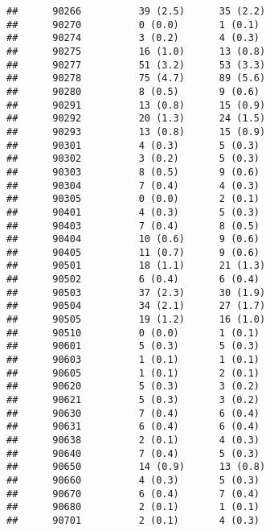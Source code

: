 \documentclass[]{article}
\begin{document}
\begin{verbatim}
##      90266          39 (2.5)      35 (2.2)                      
##      90270          0 (0.0)       1 (0.1)                       
##      90274          3 (0.2)       4 (0.3)                       
##      90275          16 (1.0)      13 (0.8)                      
##      90277          51 (3.2)      53 (3.3)                      
##      90278          75 (4.7)      89 (5.6)                      
##      90280          8 (0.5)       9 (0.6)                       
##      90291          13 (0.8)      15 (0.9)                      
##      90292          20 (1.3)      24 (1.5)                      
##      90293          13 (0.8)      15 (0.9)                      
##      90301          4 (0.3)       5 (0.3)                       
##      90302          3 (0.2)       5 (0.3)                       
##      90303          8 (0.5)       9 (0.6)                       
##      90304          7 (0.4)       4 (0.3)                       
##      90305          0 (0.0)       2 (0.1)                       
##      90401          4 (0.3)       5 (0.3)                       
##      90403          7 (0.4)       8 (0.5)                       
##      90404          10 (0.6)      9 (0.6)                       
##      90405          11 (0.7)      9 (0.6)                       
##      90501          18 (1.1)      21 (1.3)                      
##      90502          6 (0.4)       6 (0.4)                       
##      90503          37 (2.3)      30 (1.9)                      
##      90504          34 (2.1)      27 (1.7)                      
##      90505          19 (1.2)      16 (1.0)                      
##      90510          0 (0.0)       1 (0.1)                       
##      90601          5 (0.3)       5 (0.3)                       
##      90603          1 (0.1)       1 (0.1)                       
##      90605          1 (0.1)       2 (0.1)                       
##      90620          5 (0.3)       3 (0.2)                       
##      90621          5 (0.3)       3 (0.2)                       
##      90630          7 (0.4)       6 (0.4)                       
##      90631          6 (0.4)       6 (0.4)                       
##      90638          2 (0.1)       4 (0.3)                       
##      90640          7 (0.4)       5 (0.3)                       
##      90650          14 (0.9)      13 (0.8)                      
##      90660          4 (0.3)       5 (0.3)                       
##      90670          6 (0.4)       7 (0.4)                       
##      90680          2 (0.1)       1 (0.1)                       
##      90701          2 (0.1)       4 (0.3)                       

\end{verbatim}
\end{document}
